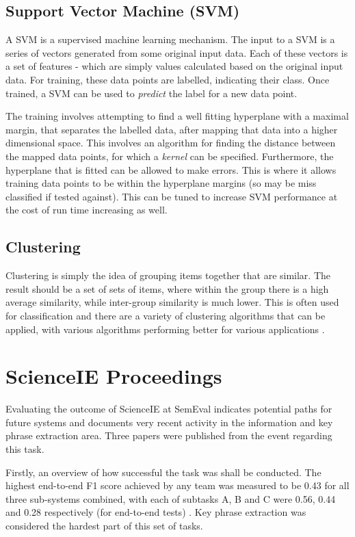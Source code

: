 \subsection*{Support Vector Machine (SVM)}
A SVM is a supervised machine learning mechanism. The input to a SVM is a series of vectors generated from some original input data. Each of these vectors is a set of features - which are simply values calculated based on the original input data. For training, these data points are labelled, indicating their class. Once trained, a SVM can be used to \textit{predict} the label for a new data point.

The training involves attempting to find a well fitting hyperplane with a maximal margin, that separates the labelled data, after mapping that data into a higher dimensional space. This involves an algorithm for finding the distance between the mapped data points, for which a \textit{kernel} can be specified. Furthermore, the hyperplane that is fitted can be allowed to make errors. This is where it allows training data points to be within the hyperplane margins (so may be miss classified if tested against). This can be tuned to increase SVM performance at the cost of run time increasing as well.

\subsection*{Clustering}
Clustering is simply the idea of grouping items together that are similar. The result should be a set of sets of items, where within the group there is a high average similarity, while inter-group similarity is much lower. This is often used for classification and there are a variety of clustering algorithms that can be applied, with various algorithms performing better for various applications \cite{Rai2010}.

\section{ScienceIE Proceedings}
Evaluating the outcome of ScienceIE at SemEval indicates potential paths for future systems and documents very recent activity in the information and key phrase extraction area. Three papers were published from the event regarding this task.

Firstly, an overview of how successful the task was shall be conducted. The highest end-to-end F1 score achieved by any team was measured to be 0.43 for all three sub-systems combined, with each of subtasks A, B and C were 0.56, 0.44 and 0.28 respectively (for end-to-end tests) \cite{Augenstein2017}. Key phrase extraction was considered the hardest part of this set of tasks.

